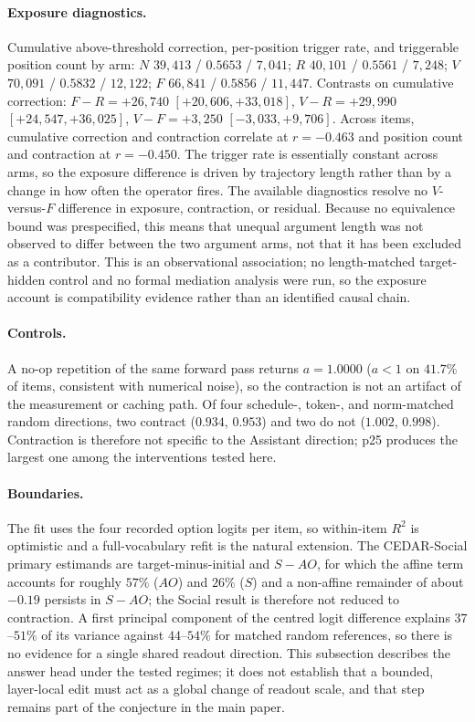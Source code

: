 \documentclass[letterpaper]{article}
\begin{document}
\paragraph{Exposure diagnostics.}
Cumulative above-threshold correction, per-position trigger rate, and triggerable position count by arm: $N$ $39{,}413$ / $0.5653$ / $7{,}041$; $R$ $40{,}101$ / $0.5561$ / $7{,}248$; $V$ $70{,}091$ / $0.5832$ / $12{,}122$; $F$ $66{,}841$ / $0.5856$ / $11{,}447$. Contrasts on cumulative correction: $F-R=+26{,}740$ $[+20{,}606,+33{,}018]$, $V-R=+29{,}990$ $[+24{,}547,+36{,}025]$, $V-F=+3{,}250$ $[-3{,}033,+9{,}706]$. Across items, cumulative correction and contraction correlate at $r=-0.463$ and position count and contraction at $r=-0.450$. The trigger rate is essentially constant across arms, so the exposure difference is driven by trajectory length rather than by a change in how often the operator fires. The available diagnostics resolve no $V$-versus-$F$ difference in exposure, contraction, or residual. Because no equivalence bound was prespecified, this means that unequal argument length was not observed to differ between the two argument arms, not that it has been excluded as a contributor. This is an observational association; no length-matched target-hidden control and no formal mediation analysis were run, so the exposure account is compatibility evidence rather than an identified causal chain.

\paragraph{Controls.}
A no-op repetition of the same forward pass returns $a=1.0000$ ($a<1$ on $41.7\%$ of items, consistent with numerical noise), so the contraction is not an artifact of the measurement or caching path. Of four schedule-, token-, and norm-matched random directions, two contract ($0.934$, $0.953$) and two do not ($1.002$, $0.998$). Contraction is therefore not specific to the Assistant direction; p25 produces the largest one among the interventions tested here.

\paragraph{Boundaries.}
The fit uses the four recorded option logits per item, so within-item $R^{2}$ is optimistic and a full-vocabulary refit is the natural extension. The CEDAR-Social primary estimands are target-minus-initial and $S-AO$, for which the affine term accounts for roughly $57\%$ ($AO$) and $26\%$ ($S$) and a non-affine remainder of about $-0.19$ persists in $S-AO$; the Social result is therefore not reduced to contraction. A first principal component of the centred logit difference explains $37$--$51\%$ of its variance against $44$--$54\%$ for matched random references, so there is no evidence for a single shared readout direction. This subsection describes the answer head under the tested regimes; it does not establish that a bounded, layer-local edit must act as a global change of readout scale, and that step remains part of the conjecture in the main paper.
\end{document}
